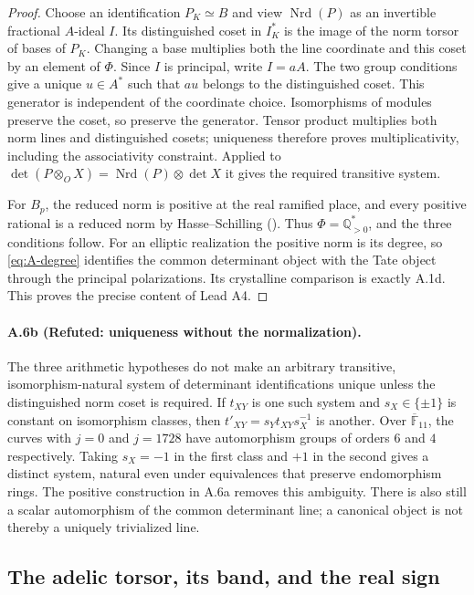 \begin{proof}
Choose an identification $P_K\simeq B$ and view $\operatorname{Nrd}(P)$
as an invertible fractional $A$-ideal $I$. Its distinguished coset in
$I_K^*$ is the image of the norm torsor of bases of $P_K$.
Changing a base multiplies both the line coordinate and this coset by
an element of $\Phi$. Since $I$ is principal, write $I=aA$.
The two group conditions give a unique $u\in A^*$ such that $au$
belongs to the distinguished coset. This generator is independent of
the coordinate choice. Isomorphisms of modules preserve the coset,
so preserve the generator. Tensor product multiplies both norm lines
and distinguished cosets; uniqueness therefore proves multiplicativity,
including the associativity constraint. Applied to
$\det(P\otimes_OX)=\operatorname{Nrd}(P)\otimes\det X$ it gives
the required transitive system.

For $B_p$, the reduced norm is positive at the real ramified place,
and every positive rational is a reduced norm by Hasse--Schilling
(\citealp[Main Theorem 14.7.4]{Voight2021}). Thus
$\Phi=\mathbb Q_{>0}^*$, and the three conditions follow.
For an elliptic realization the positive norm is its degree, so
\eqref{eq:A-degree} identifies the common determinant object with the
Tate object through the principal polarizations. Its crystalline
comparison is exactly A.1d. This proves the precise content of Lead A4.
\end{proof}

\paragraph{A.6b (Refuted: uniqueness without the normalization).}
The three arithmetic hypotheses do not make an arbitrary transitive,
isomorphism-natural system of determinant identifications unique unless
the distinguished norm coset is required. If $t_{XY}$ is one such
system and $s_X\in\{\pm1\}$ is constant on isomorphism classes, then
$t'_{XY}=s_Yt_{XY}s_X^{-1}$ is another. Over $\overline{\mathbb F}_{11}$,
the curves with $j=0$ and $j=1728$ have automorphism groups of orders
$6$ and $4$ respectively. Taking $s_X=-1$ in the first class and $+1$
in the second gives a distinct system, natural even under equivalences
that preserve endomorphism rings. The positive construction in A.6a
removes this ambiguity. There is also still a scalar automorphism of
the common determinant line; a canonical object is not thereby a
uniquely trivialized line.

\subsection{The adelic torsor, its band, and the real sign}

